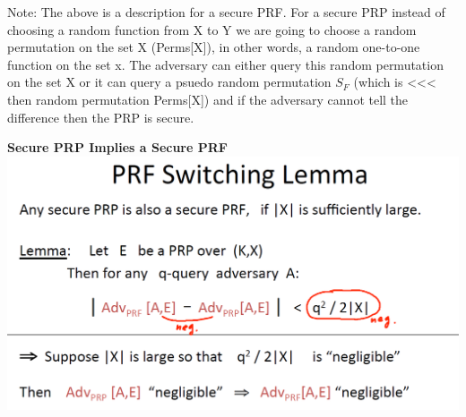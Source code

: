 \documentclass[11pt]{article}
\makeatletter
\def\maxwidth{\ifdim\Gin@nat@width>\linewidth\linewidth
    \else\Gin@nat@width\fi}
\let\Oldincludegraphics\includegraphics
\renewcommand{\includegraphics}[1]{\Oldincludegraphics[width=.8\maxwidth]{#1}}
\makeatother
\begin{document}
Note: The above is a description for a secure PRF. For a secure PRP
instead of choosing a random function from X to Y we are going to choose
a random permutation on the set X (Perms{[}X{]}), in other words, a
random one-to-one function on the set x. The adversary can either query
this random permutation on the set X or it can query a psuedo random
permutation \(S_{F}\) (which is \textless{}\textless{}\textless{} then
random permutation Perms{[}X{]}) and if the adversary cannot tell the
difference then the PRP is secure.

\textbf{Secure PRP Implies a Secure PRF}
\includegraphics{./Images/SecurePRP2PRF.png}
\end{document}
